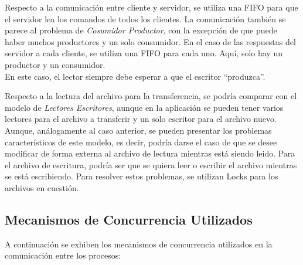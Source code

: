 \documentclass[a4paper,10pt]{article}
\begin{document}
	Respecto a la comunicaci\'on entre cliente y servidor, se utiliza una FIFO para que el servidor lea los comandos de 
	todos los clientes. La comunicaci\'on tambi\'en se parece al problema de \emph{Cosumidor Productor},
	 con la
	 excepci\'on de que puede haber muchos productores y un solo consumidor. En el caso de las respuestas del servidor
	 a cada
	 cliente, se utiliza una FIFO para cada uno. Aqu\'i, solo hay un productor y un consumidor.\\
	En este caso, el lector siempre debe esperar a que el escritor ``produzca''.

	Respecto a la lectura del archivo para la transferencia, se podr\'ia comparar con el modelo de \emph{Lectores
	 Escritores}, aunque en la aplicaci\'on se pueden tener varios lectores para el archivo a transferir
	y un solo escritor para el archivo nuevo. \\Aunque, an\'alogamente 
	al caso anterior, se pueden presentar los problemas caracter\'isticos de este modelo, es decir, podr\'ia darse el caso
	de que se desee modificar de forma externa al archivo de lectura mientras est\'a siendo leido. Para el archivo de 
	escritura, 
	podr\'ia ser que se quiera leer o escribir el archivo mientras se est\'a escribiendo. 
	Para resolver estos problemas, se utilizan
	 Locks para los archivos en cuesti\'on.

	\subsection{Mecanismos de Concurrencia Utilizados}
		A continuaci\'on se exhiben los mecanismos de concurrencia utilizados en la comunicaci\'on entre los procesos:
\end{document}
